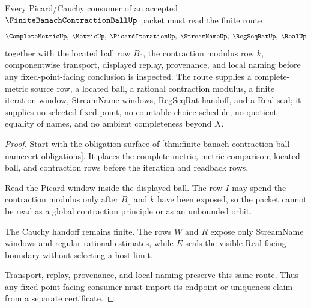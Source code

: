\begin{theorem}
\label{thm:finite-banach-contraction-ball-picard-cauchy-route}
Every Picard/Cauchy consumer of an accepted $\FiniteBanachContractionBallUp$ packet must read the finite route
$$
\CompleteMetricUp,\ \MetricUp,\ \PicardIterationUp,\ \StreamNameUp,\ \RegSeqRatUp,\ \RealUp
$$
together with the located ball row $B_0$, the contraction modulus row $k$, componentwise transport, displayed replay, provenance, and local naming before any fixed-point-facing conclusion is inspected. The route supplies a complete-metric source row, a located ball, a rational contraction modulus, a finite iteration window, StreamName windows, RegSeqRat handoff, and a Real seal; it supplies no selected fixed point, no countable-choice schedule, no quotient equality of names, and no ambient completeness beyond $X$.
\end{theorem}
\begin{proof}
Start with the obligation surface of \autoref{thm:finite-banach-contraction-ball-namecert-obligations}. It places the complete metric, metric comparison, located ball, and contraction rows before the iteration and readback rows.

Read the Picard window inside the displayed ball. The row $I$ may spend the contraction modulus only after $B_0$ and $k$ have been exposed, so the packet cannot be read as a global contraction principle or as an unbounded orbit.

The Cauchy handoff remains finite. The rows $W$ and $R$ expose only StreamName windows and regular rational estimates, while $E$ seals the visible Real-facing boundary without selecting a host limit.

Transport, replay, provenance, and local naming preserve this same route. Thus any fixed-point-facing consumer must import its endpoint or uniqueness claim from a separate certificate.
\end{proof}



